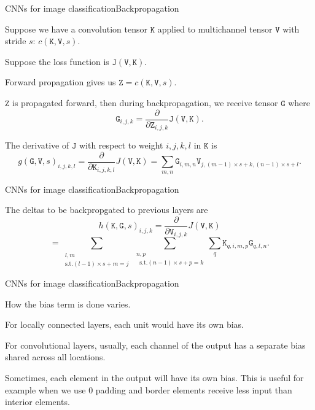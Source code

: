 \documentclass{beamer}
\newcommand{\mat}[1]{\mathtt{#1}}
\begin{document}
\begin{frame}{CNNs for image classification}{Backpropagation}

Suppose we have a convolution tensor $\mat{K}$ applied to multichannel
tensor $\mat{V}$ with stride $s$: $c(\mat{K},\mat{V},s)$.

\medskip

Suppose the loss function is $\mat{J}(\mat{V},\mat{K})$.

\medskip

Forward propagation gives us $\mat{Z} = c(\mat{K},\mat{V},s)$.

\medskip

$\mat{Z}$ is propagated forward, then during backpropagation, we
receive tensor $\mat{G}$ where
$$\mat{G}_{i,j,k} = \frac{\partial}{\partial \mat{Z}_{i,j,k}}
\mat{J}(\mat{V},\mat{K}) .$$

The derivative of $\mat{J}$ with respect to weight $i,j,k,l$ in $\mat{K}$
is
$$ g(\mat{G},\mat{V},s)_{i,j,k,l} = \frac{\partial}{\partial \mat{K}_{i,j,k,l}}
J(\mat{V},\mat{K}) =
\sum_{m,n} \mat{G}_{i,m,n} \mat{V}_{j,(m-1)\times s+k,(n-1)\times s + l}.$$

\end{frame}


\begin{frame}{CNNs for image classification}{Backpropagation}

The deltas to be backpropgated to previous layers are
$$h(\mat{K},\mat{G},s)_{i,j,k} = \frac{\partial}{\partial \mat{V}_{i,j,k}}
J(\mat{V},\mat{K})$$
$$= \sum_{\substack{l,m\\ \textrm{s.t.} (l-1)\times s + m = j}}
\sum_{\substack{n,p\\ \;\; \textrm{s.t.} (n-1)\times s + p = k}}
\sum_q \mat{K}_{q,i,m,p} \mat{G}_{q,l,n}.$$

\end{frame}


\begin{frame}{CNNs for image classification}{Backpropagation}

  How the bias term is done varies.

  \medskip

  For locally connected layers, each
  unit would have its own bias.

  \medskip

  For convolutional layers, usually, each channel of the output has a
  separate bias shared across all locations.

  \medskip

  Sometimes, each element in the output will have its own bias. This
  is useful for example when we use 0 padding and border elements
  receive less input than interior elements.

\end{frame}
\end{document}
